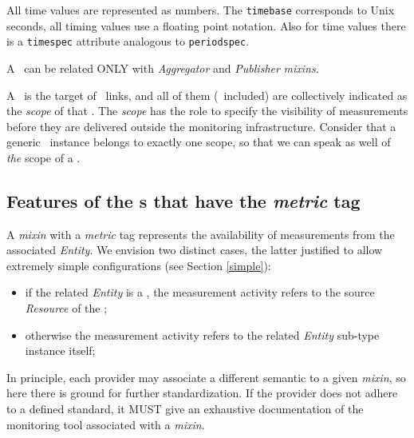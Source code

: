 \documentclass[10pt]{article}  %
\begin{document}
All time values are represented as numbers. The {\tt timebase} corresponds to Unix seconds, all timing values use a floating point notation. Also for time values there is a {\tt timespec} attribute analogous to {\tt periodspec}.

A \sens\ can be related ONLY with {\em Aggregator} and {\em Publisher} {\em mixins}.

A \sens\ is the target of \coll\ links, and all of them (\sens\ included) are collectively indicated as the {\em scope} of that \sens . The {\em scope} has the role to specify the visibility of measurements before they are delivered outside the monitoring infrastructure. Consider that a generic \coll\ instance belongs to exactly one scope, so that we can speak as well of {\em the} scope of a \coll .
 


\subsection{Features of the \mi s that have the {\em metric} tag \label{sec:Tool}}

A {\em mixin} with a {\em metric} tag represents the availability of measurements from the associated {\em Entity}. We envision two distinct cases, the latter justified to allow extremely simple configurations (see Section \ref{simple}):
\begin{itemize}
\item if the related {\em Entity} is a \coll, the measurement activity refers to the source {\em Resource} of the \coll;
\item otherwise the measurement activity refers to the related {\em Entity} sub-type instance itself;
\end{itemize} 

\newcommand{\misem}[1]{In principle, each provider may associate a different semantic to a given {\em mixin}, so here there is ground for further standardization. If the provider does not adhere to a defined standard, it MUST give an exhaustive documentation of #1 associated with a {\em mixin}.}

\misem{the monitoring tool}
\end{document}
